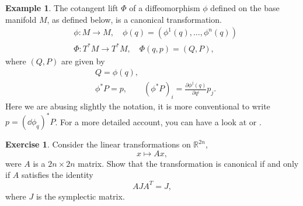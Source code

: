 \documentclass[english,fontsize=11pt,paper=b5]{scrbook}
\theoremstyle{definition}
\newtheorem{example}{Example}[chapter]
\newtheorem{exercise}{Exercise}[chapter]
\begin{document}
    \begin{example}\label{ex:hamlift1}
      The cotangent lift $\Phi$ of a diffeomorphism $\phi$ defined on the base manifold $M$, as defined below, is a canonical transformation.
      \begin{align}
     & \phi:M\to M, \quad \phi(q) = \left(\phi^1(q), \ldots, \phi^n(q)\right) \\
     & \Phi:T^*M\to T^*M, \quad \Phi(q,p) = (Q, P),
      \end{align}
      where $(Q,P)$ are given by
      \begin{align}
     & Q = \phi(q),                                                                     \\
     & \phi^* P = p, \qquad (\phi^* P)_i = \frac{\partial \phi^j(q)}{\partial q^i} p_j.
      \end{align}
      Here we are abusing slightly the notation, it is more conventional to write $p = (\dd\phi_{q})^* P$.
      For a more detailed account, you can have a look at \cite[Chapter 6.3 and in particular formula (6.3.4)]{book:marsdenratiu} or \cite[Proposition 6.2.8]{lectures:aom:seri}.
    \end{example}

    \begin{exercise}
      Consider the linear transformations on $\mathbb{R}^{2n}$,
      \begin{equation}
        x \mapsto A x,
      \end{equation}
      were $A$ is a $2n\times2n$ matrix.
      Show that the transformation is canonical if and only if $A$ satisfies the identity
      \begin{equation}
        A J A^T = J,
      \end{equation}
      where $J$ is the symplectic matrix.
    \end{exercise}
\end{document}
